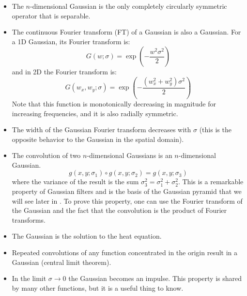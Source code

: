 \begin{itemize}
\item The $n$-dimensional Gaussian is the only completely circularly symmetric operator that is separable. 

\item The continuous Fourier transform (FT) of a Gaussian is also a Gaussian. For a 1D Gaussian, its Fourier transform is:
\begin{equation}
G (w; \sigma) = \exp{ \left( -\frac{w^2 \sigma^2} {2} \right) }
\end{equation}
and in 2D the Fourier transform is:
\begin{equation}
G (w_x, w_y; \sigma) = \exp{ \left(- \frac{(w_x^2+w_y^2) \sigma^2} {2} \right) }
\label{eq:FTgauss2d}
\end{equation}
Note that this function is monotonically decreasing in magnitude for increasing frequencies, and it is also radially symmetric. 

\item The width of the Gaussian Fourier transform decreases with $\sigma$ (this is the opposite behavior to the Gaussian in the spatial domain).

\item The convolution of two $n$-dimensional Gaussians is an $n$-dimensional Gaussian.  
\begin{equation}
g (x,y; \sigma_1 ) \circ g (x,y; \sigma_2)  = g (x,y; \sigma_3)
\end{equation}
where the variance of the result is the sum $\sigma_3^2 = \sigma_1^2 + \sigma_2^2$. This is a remarkable property of Gaussian filters and is the basis of the Gaussian pyramid that we will see later in \chap{\ref{chapter:image_pyramids}}. To prove this property, one can use the Fourier transform of the Gaussian and the fact that the convolution is the product of Fourier transforms.

\item The Gaussian is the solution to the heat equation. 

\item Repeated convolutions of any function concentrated in the origin result in a Gaussian (central limit theorem).

\item In the limit $\sigma \rightarrow 0$ the Gaussian becomes an impulse. This property is shared by many other functions, but it is a useful thing to know.
\end{itemize}

